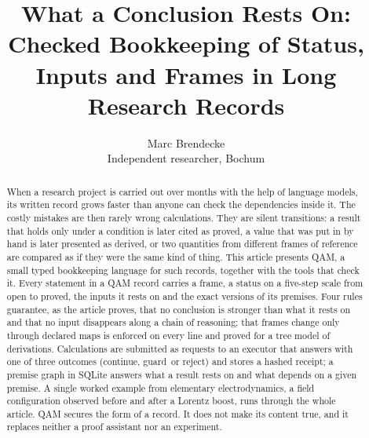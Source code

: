 \documentclass[11pt]{article}
\title{What a Conclusion Rests On:\\[2pt]
\large Checked Bookkeeping of Status, Inputs and Frames in Long Research Records}
\author{Marc Brendecke\\ \small Independent researcher, Bochum}
\date{\releaseline}
\theoremstyle{definition}
\theoremstyle{remark}
\newcommand{\st}[1]{\textsf{#1}}
\newcommand{\cont}{\textsf{continue}}
\newcommand{\guard}{\textsf{guard}}
\newcommand{\reject}{\textsf{reject}}
\begin{document}
\maketitle

\begin{abstract}
\noindent
When a research project is carried out over months with the help of language models, its written record grows faster than anyone
can check the dependencies inside it. The costly mistakes are then rarely wrong calculations. They are silent transitions: a result
that holds only under a condition is later cited as proved, a value that was put in by hand is later presented as derived, or two
quantities from different frames of reference are compared as if they were the same kind of thing. This article presents QAM, a small
typed bookkeeping language for such records, together with the tools that check it. Every statement in a QAM record carries a frame,
a status on a five-step scale from \st{open} to \st{proved}, the inputs it rests on and the exact versions of its premises. Four rules
guarantee, as the article proves, that no conclusion is stronger than what it rests on and that no input disappears along
a chain of reasoning; that frames change only through declared maps is enforced on every line and proved for a tree model of
derivations. Calculations are submitted as requests to an executor that
answers with one of three outcomes (\cont, \guard\ or \reject) and stores a hashed receipt; a premise graph in SQLite answers what
a result rests on and what depends on a given premise. A single worked example from elementary electrodynamics, a field
configuration observed before and after a Lorentz boost, runs through the whole article. QAM secures the form of a record. It does
not make its content true, and it replaces neither a proof assistant nor an experiment.
\end{abstract}













\appendix





\end{document}
